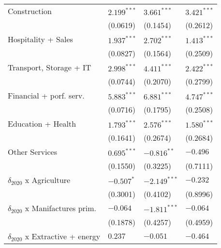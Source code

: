 \begin{tabular}{llll}
Construction                                       &      $2.199^{***}$ &      $3.661^{***}$ &      $3.421^{***}$ \\
                                                   &           (0.0619) &           (0.1454) &           (0.2612) \\
Hospitality + Sales                                &      $1.937^{***}$ &      $2.702^{***}$ &      $1.413^{***}$ \\
                                                   &           (0.0827) &           (0.1564) &           (0.2509) \\
Transport, Storage + IT                            &      $2.998^{***}$ &      $4.411^{***}$ &      $2.422^{***}$ \\
                                                   &           (0.0744) &           (0.2070) &           (0.2799) \\
Financial + porf. serv.                            &      $5.883^{***}$ &      $6.881^{***}$ &      $4.747^{***}$ \\
                                                   &           (0.0716) &           (0.1795) &           (0.2508) \\
Education + Health                                 &      $1.793^{***}$ &      $2.576^{***}$ &      $1.580^{***}$ \\
                                                   &           (0.1641) &           (0.2674) &           (0.2684) \\
Other Services                                     &      $0.695^{***}$ &      $-0.816^{**}$ &           $-0.496$ \\
                                                   &           (0.1550) &           (0.3225) &           (0.7111) \\
$\delta_{2020}$ x Agriculture                      &         $-0.507^*$ &     $-2.149^{***}$ &           $-0.232$ \\
                                                   &           (0.3001) &           (0.4102) &           (0.8996) \\
$\delta_{2020}$ x Manifactures prim.               &           $-0.064$ &     $-1.811^{***}$ &           $-0.064$ \\
                                                   &           (0.1878) &           (0.4257) &           (0.4959) \\
$\delta_{2020}$ x Extractive + energy              &            $0.237$ &           $-0.051$ &           $-0.464$ \\

\end{tabular}
